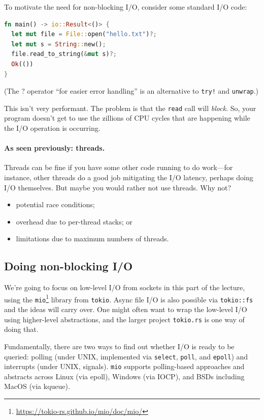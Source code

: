 \documentclass[a4paper]{report}
\begin{document}
To motivate the need for non-blocking I/O, consider some standard I/O code:

\begin{lstlisting}[language=Rust]
fn main() -> io::Result<()> {
  let mut file = File::open("hello.txt")?;
  let mut s = String::new();
  file.read_to_string(&mut s)?;
  Ok(()) 
}
\end{lstlisting}
(The ? operator ``for easier error handling'' is an alternative to
\texttt{try!} and \texttt{unwrap}.)

This isn't very performant. The problem is that the {\tt read} call will
{\em block}. So, your program doesn't get to use the zillions of CPU cycles that
are happening while the I/O operation is occurring.

\paragraph{As seen previously: threads.} Threads can be fine if
you have some other code running to do work---for instance, other threads
do a good job mitigating the I/O latency, perhaps doing I/O themselves.
But maybe you would rather not use threads. Why not?
\begin{itemize}[noitemsep,topsep=-1em]
\item potential race conditions;
\item overhead due to per-thread stacks; or
\item limitations due to maximum numbers of threads.
\end{itemize}

\subsection*{Doing non-blocking I/O}
We're going to focus on low-level I/O from sockets in this part of the lecture,
using the \texttt{mio}\footnote{\url{https://tokio-rs.github.io/mio/doc/mio/}} library from \texttt{tokio}. Async file I/O is
also possible via \texttt{tokio::fs} and the ideas will carry over.
One might often want to wrap the low-level I/O using higher-level
abstractions, and the larger project \texttt{tokio.rs} is one way of
doing that.

Fundamentally,
there are two ways to find out whether I/O is ready to be queried:
polling (under UNIX, implemented via {\tt select}, {\tt poll}, and
{\tt epoll}) and interrupts (under UNIX, signals). \texttt{mio}
supports polling-based approaches and abstracts across Linux (via
epoll), Windows (via IOCP), and BSDs including MacOS (via kqueue).
\end{document}

